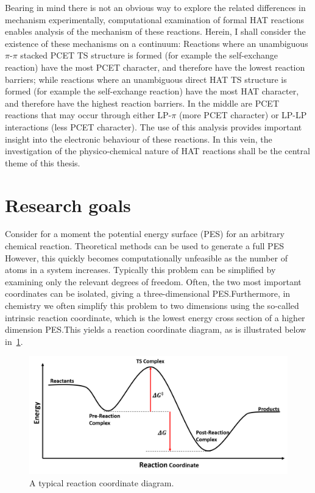 \begin{doublespace}
Bearing in mind there is not an obvious way to explore the related differences
in mechanism experimentally, computational examination of formal HAT reactions
enables analysis of the mechanism of these reactions. Herein, I shall consider
the existence of these mechanisms on a continuum: Reactions where an unambiguous
$\pi$-$\pi$ stacked PCET TS structure is formed (for example the  self-exchange reaction) have the most PCET character, and therefore have
the lowest reaction barriers; while reactions where an unambiguous direct HAT TS
structure is formed (for example the  self-exchange reaction)
have the most HAT character, and therefore have the highest reaction barriers.
In the middle are PCET reactions that may occur through either LP-$\pi$ (more
PCET character) or LP-LP interactions (less PCET character). The use of this
analysis provides important insight into the electronic behaviour of these
reactions. In this vein, the investigation of the physico-chemical nature of HAT
reactions shall be the central theme of this thesis.

\section{Research goals}

Consider for a moment the potential energy surface (PES) for an arbitrary
chemical reaction. Theoretical methods can be used to generate a full PES
However, this quickly becomes computationally unfeasible as the number of atoms
in a system increases. Typically this problem can be simplified by examining
only the relevant degrees of freedom. Often, the two most important coordinates
can be isolated, giving a three-dimensional PES.\@ Furthermore, in chemistry we
often simplify this problem to two dimensions using the so-called intrinsic
reaction coordinate, which is the lowest energy cross section of a higher
dimension PES.\@ This yields a reaction coordinate diagram, as is illustrated
below in~\ref{fig:pes}.

\begin{figure}[htb]
  \centering
  \includegraphics[width=\textwidth]{figures/pes}
  \caption[A typical reaction coordinate diagram.]{A typical reaction
  coordinate diagram.}
\label{fig:pes}
\end{figure}


\end{doublespace}

